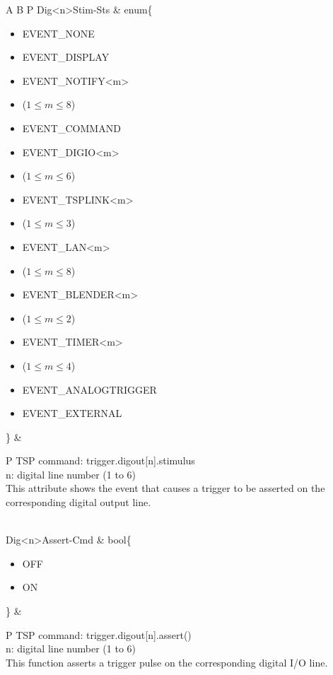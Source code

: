 \documentclass[openany]{article}
\begin{document}
\begin{longtable}{A B P}
		Dig{\textless n\textgreater}Stim-Sts & enum\{\begin{itemize}[noitemsep]
					\small
					\item[] EVENT\_NONE
					\item[] EVENT\_DISPLAY
					\item[] EVENT\_NOTIFY\textless m\textgreater
					\item[] ($1\leq m\leq 8$)
					\item[] EVENT\_COMMAND
					\item[] EVENT\_DIGIO\textless m\textgreater
					\item[] ($1\leq m\leq 6$)
					\item[] EVENT\_TSPLINK\textless m\textgreater
					\item[] ($1\leq m\leq 3$)
					\item[] EVENT\_LAN\textless m\textgreater
					\item[] ($1\leq m\leq 8$)
					\item[] EVENT\_BLENDER\textless m\textgreater 
					\item[] ($1\leq m\leq 2$)
					\item[] EVENT\_TIMER\textless m\textgreater
					\item[] ($1\leq m\leq 4$)
					\item[] EVENT\_ANALOGTRIGGER
					\item[] EVENT\_EXTERNAL
				\end{itemize}\} & 
				\begin{tabular}{P}
					TSP command: trigger.digout[n].stimulus \\
					n: digital line number (1 to 6) \\
					This attribute shows the event that causes a trigger to be asserted on the corresponding digital output line.
				\end{tabular} \\ \hline
		Dig{\textless n\textgreater}Assert-Cmd & bool\{\begin{itemize}[noitemsep]
					\small
					\item[] OFF
					\item[] ON
				\end{itemize}\} & 
				\begin{tabular}{P}
					TSP command: trigger.digout[n].assert() \\
					n: digital line number (1 to 6) \\
					This function asserts a trigger pulse on the corresponding digital I/O line.
				\end{tabular} \\ \hline

\end{longtable}
\end{document}
